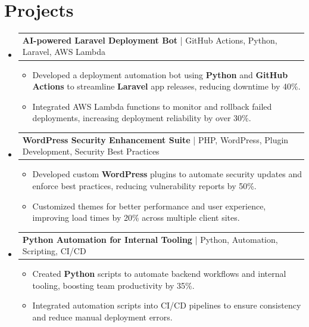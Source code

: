 \documentclass[letterpaper,11pt]{article}
\makeatletter
\newcommand{\resumeItem}[1]{
  \item\footnotesize{
    {#1 \vspace{-2pt}}
  }
}
\newcommand{\resumeProjectHeading}[2]{
    \item
    \begin{tabular*}{1.001\textwidth}{l@{\extracolsep{\fill}}r}
      \small#1 & \textbf{\small #2}\\
    \end{tabular*}\vspace{-7pt}
}
\newcommand{\resumeSubHeadingListStart}{\begin{itemize}[leftmargin=0pt, label={}]}
\newcommand{\resumeSubHeadingListEnd}{\end{itemize}}
\newcommand{\resumeItemListStart}{\begin{itemize}[leftmargin=*]}
\newcommand{\resumeItemListEnd}{\end{itemize}\vspace{-5pt}}
\makeatother
\begin{document}
\section{Projects}
    \vspace{-5pt}
    \resumeSubHeadingListStart
          \resumeProjectHeading
              {\textbf{AI-powered Laravel Deployment Bot} | GitHub Actions, Python, Laravel, AWS Lambda}{}
        \resumeItemListStart
            \resumeItem{Developed a deployment automation bot using \textbf{Python} and \textbf{GitHub Actions} to streamline \textbf{Laravel} app releases, reducing downtime by 40\%.}
            \resumeItem{Integrated AWS Lambda functions to monitor and rollback failed deployments, increasing deployment reliability by over 30\%.}
        \resumeItemListEnd
        \vspace{-12pt}
    
    \resumeProjectHeading
        {\textbf{WordPress Security Enhancement Suite} | PHP, WordPress, Plugin Development, Security Best Practices}{}
        \resumeItemListStart
            \resumeItem{Developed custom \textbf{WordPress} plugins to automate security updates and enforce best practices, reducing vulnerability reports by 50\%.}
            \resumeItem{Customized themes for better performance and user experience, improving load times by 20\% across multiple client sites.}
        \resumeItemListEnd
          \vspace{-12pt}
      \resumeProjectHeading
          {\textbf{Python Automation for Internal Tooling} | Python, Automation, Scripting, CI/CD}{}
          \resumeItemListStart
              \resumeItem{Created \textbf{Python} scripts to automate backend workflows and internal tooling, boosting team productivity by 35\%.}
              \resumeItem{Integrated automation scripts into CI/CD pipelines to ensure consistency and reduce manual deployment errors.}
          \resumeItemListEnd 
    \resumeSubHeadingListEnd
\end{document}

